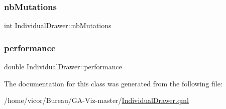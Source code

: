 \subsubsection{\texorpdfstring{nb\+Mutations}{nbMutations}}
{\footnotesize\ttfamily int Individual\+Drawer\+::nb\+Mutations}

\mbox{\label{class_individual_drawer_a7d7dc8a2d50bab0ede8b3c9fad4976ac}} 
\subsubsection{\texorpdfstring{performance}{performance}}
{\footnotesize\ttfamily double Individual\+Drawer\+::performance}



The documentation for this class was generated from the following file\+:\begin{DoxyCompactItemize}
\item 
/home/vicor/\+Bureau/\+G\+A-\/\+Viz-\/master/\hyperlink{_individual_drawer_8qml}{Individual\+Drawer.\+qml}\end{DoxyCompactItemize}
